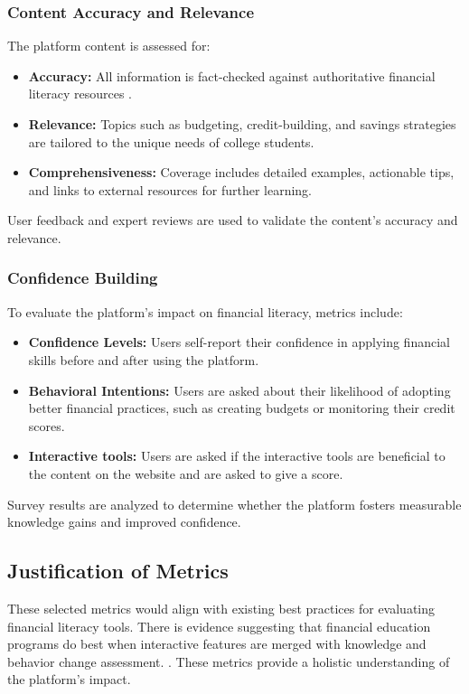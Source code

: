 \documentclass[11pt,twocolumn]{article}
\begin{document}
\subsubsection{Content Accuracy and Relevance}
The platform content is assessed for:
\begin{itemize}
    \item \textbf{Accuracy:} All information is fact-checked against authoritative financial literacy resources \cite{budgeting}.
    \item \textbf{Relevance:} Topics such as budgeting, credit-building, and savings strategies are tailored to the unique needs of college students.
    \item \textbf{Comprehensiveness:} Coverage includes detailed examples, actionable tips, and links to external resources for further learning.
\end{itemize}

User feedback and expert reviews are used to validate the content's accuracy and relevance.

\subsubsection{Confidence Building}
To evaluate the platform’s impact on financial literacy, metrics include:
\begin{itemize}
    \item \textbf{Confidence Levels:} Users self-report their confidence in applying financial skills before and after using the platform.
    \item \textbf{Behavioral Intentions:} Users are asked about their likelihood of adopting better financial practices, such as creating budgets or monitoring their credit scores.
    \item \textbf{Interactive tools:} Users are asked if the interactive tools are beneficial to the content on the website and are asked to give a score.
\end{itemize}

Survey results are analyzed to determine whether the platform fosters measurable knowledge gains and improved confidence.

\subsection{Justification of Metrics}
These selected metrics would align with existing best practices for evaluating financial literacy tools. There is evidence suggesting that financial education programs do best when interactive features are merged with knowledge and behavior change assessment. \cite{financial_effectiveness}. These metrics provide a holistic understanding of the platform’s impact.
\end{document}
